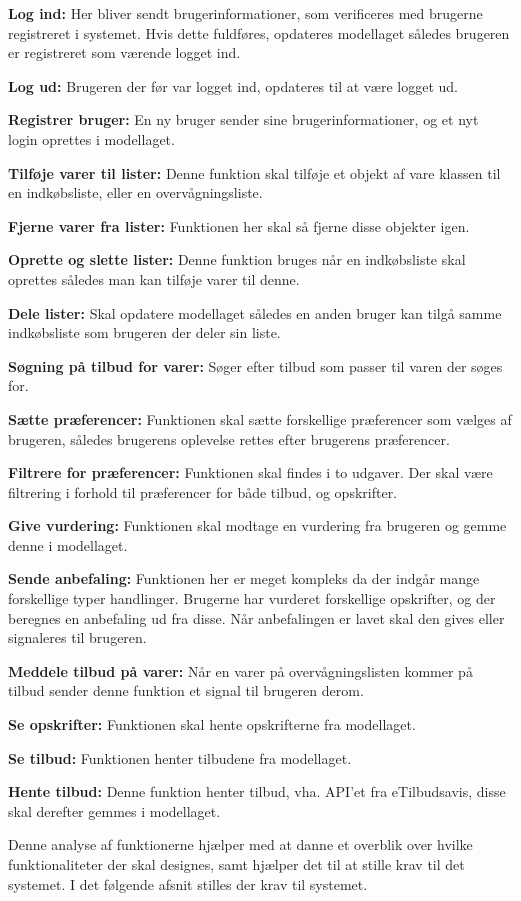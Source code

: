 \textbf{Log ind:} Her bliver sendt brugerinformationer, som verificeres med brugerne registreret i systemet.
Hvis dette fuldføres, opdateres modellaget således brugeren er registreret som værende logget ind.

\textbf{Log ud:} Brugeren der før var logget ind, opdateres til at være logget ud.

\textbf{Registrer bruger:} En ny bruger sender sine brugerinformationer, og et nyt login oprettes i modellaget.

\textbf{Tilføje varer til lister:} Denne funktion skal tilføje et objekt af vare klassen til en indkøbsliste, eller en overvågningsliste.

\textbf{Fjerne varer fra lister:} Funktionen her skal så fjerne disse objekter igen.

\textbf{Oprette og slette lister:} Denne funktion bruges når en indkøbsliste skal oprettes således man kan tilføje varer til denne.

\textbf{Dele lister:} Skal opdatere modellaget således en anden bruger kan tilgå samme indkøbsliste som brugeren der deler sin liste.

\textbf{Søgning på tilbud for varer:} Søger efter tilbud som passer til varen der søges for.

\textbf{Sætte præferencer:} Funktionen skal sætte forskellige præferencer som vælges af brugeren, således brugerens oplevelse rettes efter brugerens præferencer.

\textbf{Filtrere for præferencer:} Funktionen skal findes i to udgaver. Der skal være filtrering i forhold til præferencer for både tilbud, og opskrifter.

\textbf{Give vurdering:} Funktionen skal modtage en vurdering fra brugeren og gemme denne i modellaget.

\textbf{Sende anbefaling:} Funktionen her er meget kompleks da der indgår mange forskellige typer handlinger.
Brugerne har vurderet forskellige opskrifter, og der beregnes en anbefaling ud fra disse.
Når anbefalingen er lavet skal den gives eller signaleres til brugeren.

\textbf{Meddele tilbud på varer:} Når en varer på overvågningslisten kommer på tilbud sender denne funktion et signal til brugeren derom.

\textbf{Se opskrifter:} Funktionen skal hente opskrifterne fra modellaget.

\textbf{Se tilbud:} Funktionen henter tilbudene fra modellaget.

\textbf{Hente tilbud:} Denne funktion henter tilbud, vha. API'et fra eTilbudsavis, disse skal derefter gemmes i modellaget.

Denne analyse af funktionerne hjælper med at danne et overblik over hvilke funktionaliteter der skal designes, samt hjælper det til at stille krav til det systemet.
I det følgende afsnit stilles der krav til systemet.
